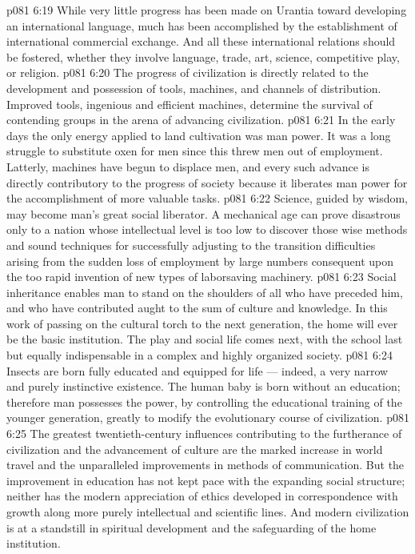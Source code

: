\vs p081 6:19 While very little progress has been made on Urantia toward developing an international language, much has been accomplished by the establishment of international commercial exchange. And all these international relations should be fostered, whether they involve language, trade, art, science, competitive play, or religion.
\vs p081 6:20 \pc {}\bibnobreakspace {} The progress of civilization is directly related to the development and possession of tools, machines, and channels of distribution. Improved tools, ingenious and efficient machines, determine the survival of contending groups in the arena of advancing civilization.
\vs p081 6:21 In the early days the only energy applied to land cultivation was man power. It was a long struggle to substitute oxen for men since this threw men out of employment. Latterly, machines have begun to displace men, and every such advance is directly contributory to the progress of society because it liberates man power for the accomplishment of more valuable tasks.
\vs p081 6:22 Science, guided by wisdom, may become man’s great social liberator. A mechanical age can prove disastrous only to a nation whose intellectual level is too low to discover those wise methods and sound techniques for successfully adjusting to the transition difficulties arising from the sudden loss of employment by large numbers consequent upon the too rapid invention of new types of laborsaving machinery.
\vs p081 6:23 \pc {}\bibnobreakspace {} Social inheritance enables man to stand on the shoulders of all who have preceded him, and who have contributed aught to the sum of culture and knowledge. In this work of passing on the cultural torch to the next generation, the home will ever be the basic institution. The play and social life comes next, with the school last but equally indispensable in a complex and highly organized society.
\vs p081 6:24 Insects are born fully educated and equipped for life --- indeed, a very narrow and purely instinctive existence. The human baby is born without an education; therefore man possesses the power, by controlling the educational training of the younger generation, greatly to modify the evolutionary course of civilization.
\vs p081 6:25 The greatest twentieth\hyp{}century influences contributing to the furtherance of civilization and the advancement of culture are the marked increase in world travel and the unparalleled improvements in methods of communication. But the improvement in education has not kept pace with the expanding social structure; neither has the modern appreciation of ethics developed in correspondence with growth along more purely intellectual and scientific lines. And modern civilization is at a standstill in spiritual development and the safeguarding of the home institution.
